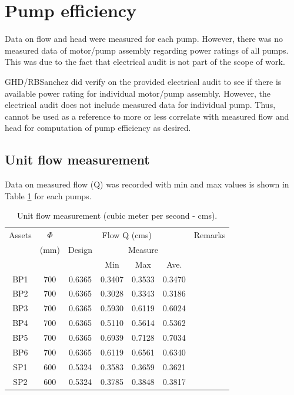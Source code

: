 \section{Pump efficiency} \label{ch04mech03}
Data on flow and head were measured for each pump. However, there was no measured data of motor/pump assembly regarding power ratings of all pumps. This was due to the fact that electrical audit is not part of the scope of work.

GHD/RBSanchez did verify on the provided electrical audit to see if there is available power rating for individual motor/pump assembly. However, the electrical audit does not include measured data for individual pump. Thus, cannot be used as a reference to more or less correlate with measured flow and head for computation of pump efficiency as desired.

\subsection{Unit flow measurement} \label{ch04mech04}
Data on measured flow (Q) was recorded with min and max values is shown in Table \ref{ch04_tbl_flow01} for each pumps. %

\begin{table}[!h]
	\caption{Unit flow measurement (cubic meter per second - cms).}
	\label{ch04_tbl_flow01}
	{\footnotesize
\begin{tabular}{c|c|c|c|c|c|l}
	\hline
	Assets & $\Phi$  & \multicolumn{4}{c|}{Flow Q (cms)} & Remarks \\ 
	\cline{3-6}
	& (mm) & Design & \multicolumn{3}{c|}{Measure} &  \\ 
	\cline{4-6}
	&  &  & Min & Max & Ave. &  \\ 
	\hline
	BP1 & 700 & 0.6365 & 0.3407 & 0.3533 & 0.3470  &  \\ 
	BP2 & 700 & 0.6365 & 0.3028 & 0.3343 & 0.3186  &  \\ 
	BP3 & 700 & 0.6365 & 0.5930 & 0.6119 & 0.6024  &  \\ 
	BP4 & 700 & 0.6365 & 0.5110 & 0.5614 & 0.5362  &  \\ 
	BP5 & 700 & 0.6365 & 0.6939 & 0.7128 & 0.7034  &  \\ 
	BP6 & 700 & 0.6365 & 0.6119 & 0.6561 & 0.6340  &  \\ 
	SP1 & 600 & 0.5324 & 0.3583 & 0.3659 & 0.3621  &  \\ 
	SP2 & 600 & 0.5324 & 0.3785 & 0.3848 & 0.3817  &  \\ 
	\hline
\end{tabular}
	}
\end{table}

